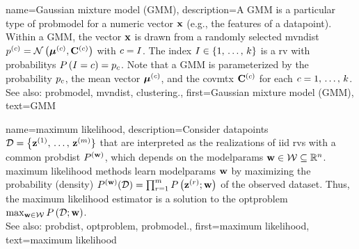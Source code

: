 {name={Gaussian mixture model (GMM)}, 
	description={A GMM 
		is a particular type of \gls{probmodel} for a numeric \gls{vector} ${\bf x}$ (e.g., 
		the \glspl{feature} of a \gls{datapoint}). Within a GMM, the \gls{vector} ${\bf x}$ 
		is drawn from a randomly selected \gls{mvndist} 
		$p^{(c)} = \mathcal{N}\left({\bm \mu}^{(c)},\mathbf{C}^{(c)}\right)$ with 
		$c = I$. The index $I \in \{1, \,\ldots, \,k\}$ is a \gls{rv} with 
		\glspl{probability} $P\left(I=c\right) = p_{c}$.
	     	Note that a GMM is parameterized by the \gls{probability} $p_{c}$, the 
		\gls{mean} \gls{vector} ${\bm \mu}^{(c)}$, and the \gls{covmtx} $\mathbf{C}^{(c)}$ 
		for each $c=1, \,\ldots, \,k$. 
				\\
		See also: \gls{probmodel}, \gls{mvndist}, \gls{clustering}.},
	first={Gaussian mixture model (GMM)},
	text={GMM} 
}
 
{name={maximum likelihood}, 
	description={Consider \glspl{datapoint} 
	$\mathcal{D}=\big\{ {\bf z}^{(1)}, \,\ldots, \,{\bf z}^{(m)} \}$ 
	that are interpreted as the \glspl{realization} of \gls{iid} \glspl{rv} 
	with a common \gls{probdist} $P^{({\bf w})}$, which depends 
	on the \glspl{modelparam} ${\bf w} \in \mathcal{W} \subseteq \mathbb{R}^{n}$. 
		\Gls{maximum} likelihood methods learn \glspl{modelparam} ${\bf w}$ by maximizing 
		the probability (density) $P^{({\bf w})}(\mathcal{D}) = \prod_{r=1}^{m} P\left({\bf z}^{(r)}; {\bf w}\right)$ 
		of the observed \gls{dataset}. Thus, the \gls{maximum} likelihood estimator is a 
		solution to the \gls{optproblem} $\max_{{\bf w} \in \mathcal{W}} P\left(\mathcal{D}; {\bf w}\right)$.
				\\
		See also: \gls{probdist}, \gls{optproblem}, \gls{probmodel}.},
	first={maximum likelihood},
	text={maximum likelihood}
}


